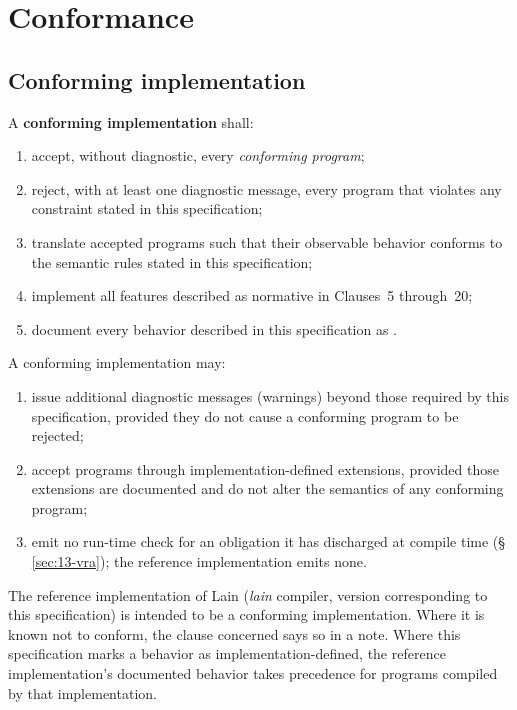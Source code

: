 \chapter{Conformance}
\label{sec:conformance}

\section{Conforming implementation}
\label{sec:conformance.impl}

\pnum
A \textbf{conforming implementation} shall:

\begin{enumerate}
  \item accept, without diagnostic, every \textit{conforming program};
  \item reject, with at least one diagnostic message, every program that
        violates any constraint stated in this specification;
  \item translate accepted programs such that their observable behavior
        conforms to the semantic rules stated in this specification;
  \item implement all features described as normative in Clauses~5
        through~20;
  \item document every behavior described in this specification as
        .
\end{enumerate}

\pnum
A conforming implementation may:

\begin{enumerate}
  \item issue additional diagnostic messages (warnings) beyond those
        required by this specification, provided they do not cause a
        conforming program to be rejected;
  \item accept programs through implementation-defined extensions, provided
        those extensions are documented and do not alter the semantics of
        any conforming program;
  \item emit no run-time check for an obligation it has discharged at compile time
        (\S\,\ref{sec:13-vra}); the reference implementation emits none.
\end{enumerate}

\begin{note}
  The reference implementation of Lain (\textit{lain} compiler, version
  corresponding to this specification) is intended to be a conforming implementation.  Where it
  is known not to conform, the clause concerned says so in a note.
  Where this specification marks a behavior as implementation-defined, the
  reference implementation's documented behavior takes precedence for
  programs compiled by that implementation.
\end{note}

